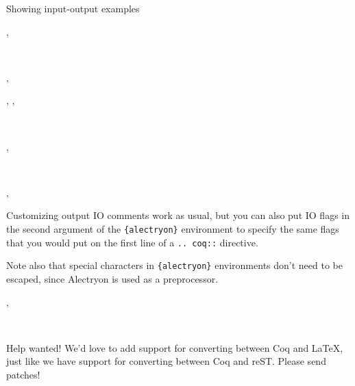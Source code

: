 \documentclass[10pt]{beamer}
\begin{document}
\begin{frame}[fragile]{Showing input-output examples}
\begin{alectryon}
  \sep
  \begin{sentence}
    \begin{input}
      ~~~
    \end{input}
    \sep
    \begin{output}
      \begin{goals}
        \begin{goal}
          \begin{hyps}\end{hyps}
          \sep
          \infrule{}
          \sep
          \begin{conclusion}
            ~~
          \end{conclusion}
        \end{goal}
      \end{goals}
    \end{output}
  \end{sentence}
  \sep
  \begin{sentence}
    \begin{input}
      ~~~\nl
    \end{input}
  \end{sentence}
  \sep
  \begin{sentence}
    \begin{input}
    \end{input}
  \end{sentence}
\end{alectryon}
\end{frame}

\begin{frame}[fragile]{Customizing output}
  IO comments work as usual, but you can also put IO flags in the second argument of the \verb|{alectryon}| environment to specify the same flags that you would put on the first line of a \verb|.. coq::| directive.

  Note also that special characters in \verb|{alectryon}| environments don't need to be escaped, since Alectryon is used as a preprocessor.



\begin{alectryon}
  \sep
  \begin{sentence}
    \begin{output}
      \begin{messages}
        \begin{message}
          ~~~~~~~~\nl
        \end{message}
      \end{messages}
    \end{output}
  \end{sentence}
\end{alectryon}
\end{frame}

\begin{frame}{Help wanted!}
  We'd love to add support for converting between Coq and LaTeX, just like we have support for converting between Coq and reST.  Please send patches!
\end{frame}
\end{document}
